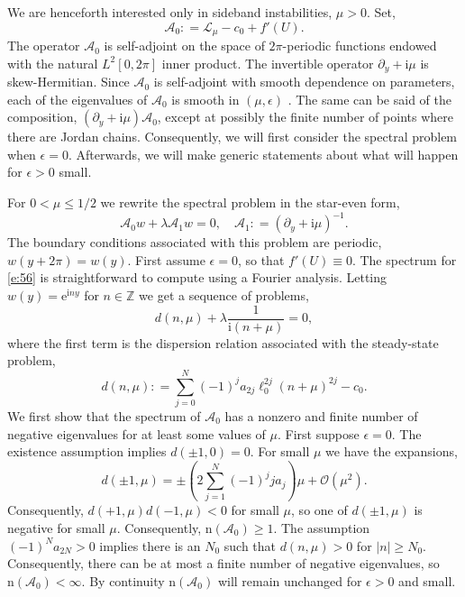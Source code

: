 \documentclass[review,onefignum,onetabnum]{siamart171218}
\newcommand{\Z}{\mathbb{Z}}
\def\coloneqq{\mathrel{\mathop:}=}
\newcommand{\rme}{\mathrm{e}}
\newcommand{\rmi}{\mathrm{i}}
\newcommand{\rmn}{\mathrm{n}}
\newcommand{\calA}{\mathcal{A}}
\newcommand{\calL}{\mathcal{L}}
\newcommand{\calO}{\mathcal{O}}
\begin{document}
We are henceforth interested only in sideband instabilities, $\mu>0$.
Set,
\[
\calA_0\coloneqq\calL_\mu-c_0+f'(U).
\]
The operator $\calA_0$ is self-adjoint on the space of $2\pi$-periodic
functions endowed with the natural $L^2[0,2\pi]$ inner product.
The invertible operator $\partial_y+\rmi\mu$ is skew-Hermitian.  Since $\calA_0$ is self-adjoint with smooth dependence on parameters, each of the eigenvalues of $\calA_0$ is smooth in $(\mu,\epsilon)$ \cite{kato:ptf80}. The same can be said of the composition, $(\partial_y+\rmi\mu)\calA_0$, except at possibly the finite number of points where there are Jordan chains.
Consequently, we will first consider the spectral problem
when $\epsilon=0$. Afterwards, we will make generic statements about what
will happen for $\epsilon>0$ small.

For $0<\mu\le1/2$ we rewrite the spectral problem in the star-even form,
\begin{equation}\label{e:56}
\calA_0w+\lambda\calA_1w=0,\quad
\calA_1\coloneqq\left(\partial_y+\rmi\mu\right)^{-1}.
\end{equation}
The boundary conditions associated with this problem are periodic,
$w(y+2\pi)=w(y)$.
First assume $\epsilon=0$, so that $f'(U)\equiv0$.
The spectrum for \cref{e:56} is straightforward to compute using a Fourier analysis. Letting
$w(y)=\rme^{\rmi ny}$ for $n\in\Z$ we get a sequence of problems,
\begin{equation}\label{e:57}
d(n,\mu)+\lambda\frac{1}{\rmi(n+\mu)}=0,
\end{equation}
where the first term is the dispersion relation associated with the
steady-state problem,
\[
d(n,\mu)\coloneqq\sum_{j=0}^N(-1)^ja_{2j}\ell_0^{2j}(n+\mu)^{2j}-c_0.
\]
We first show that the spectrum of $\calA_0$ has a nonzero and finite number of negative eigenvalues for at least some values of $\mu$.
First suppose $\epsilon=0$.
The existence assumption implies $d(\pm1,0)=0$. For small $\mu$ we have the
expansions,
\begin{equation}\label{e:58}
d(\pm1,\mu)=\pm\left(2\sum_{j=1}^N(-1)^jja_j\right)\mu+\calO(\mu^2).
\end{equation}
Consequently, $d(+1,\mu)d(-1,\mu)<0$ for small $\mu$, so one of $d(\pm1,\mu)$ is negative for small $\mu$. Consequently, $\rmn(\calA_0)\ge1$. The assumption $(-1)^Na_{2N}>0$ implies there
is an $N_0$ such that $d(n,\mu)>0$ for $|n|\ge N_0$. Consequently, there can be at most a finite number of negative eigenvalues, so
$\rmn(\calA_0)<\infty$. By continuity $\rmn(\calA_0)$ will remain unchanged for $\epsilon>0$ and small.
\end{document}
